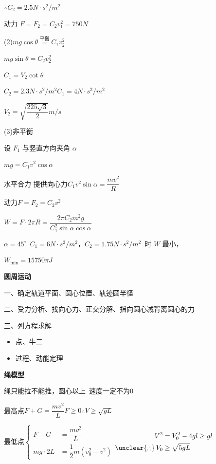 \begin{problem}
\begin{solution}
\par $\therefore C_2=2.5\unit{N\cdot s^2/m^2}$
\par 动力 $F=F_2=C_2v_1^2=750\unit{N}$
\par (2)\quad $mg\cos\theta\overset{\text{平衡}}{=}C_1v_2^2$
\par $mg\sin\theta=C_2v_2^2$
\par $C_1=V_2\cot\theta$ %
\par $C_2=2.3\unit{N\cdot s^2/m^2}$\quad $C_1=4\unit{N\cdot s^2/m^2}$
\par $V_2=\sqrt{\dfrac{225\sqrt{3}}{2}}\unit{m/s}$
\par (3)\quad 非平衡
\par 设 $F_1$ 与竖直方向夹角 $\alpha$
\par $mg=C_1v^2\cos\alpha$
\par 水平合力 提供向心力\quad $C_1v^2\sin\alpha=\dfrac{mv^2}{R}$
\par 动力\quad $F=F_2=C_2v^2$
\par $W=F\cdot 2\pi R=\dfrac{2\pi C_2m^2g}{C_1^2\sin\alpha\cos\alpha}$
\par $\alpha=45^\circ$\ $C_1=6\unit{N\cdot s^2/m^2}$，$C_2=1.75\unit{N\cdot s^2/m^2}$\ 时 $W$ 最小， %
\par $W_{\min}=15750\pi\unit{J}$
\end{solution}
\end{problem}
\textbf{圆周运动}
\par 一、确定轨道平面、圆心位置、轨迹圆半径
\par 二、受力分析、找向心力、正交分解、指向圆心减背离圆心的力
\par 三、列方程求解
\begin{itemize}
\item 点、牛二
\item 过程、动能定理
\end{itemize}
\textbf{绳模型}
\par 绳只能拉不能推，圆心以上\ 速度一定不为0
\par 最高点\quad $F+G=\dfrac{mv^2}{L}$\qquad $F\ge0$\quad $\therefore V\ge\sqrt{gL}$
\par 最低点\quad $\left\{\begin{aligned}F-G&=\dfrac{mv^2}{L}\\ mg\cdot2L&=\dfrac{1}{2}m(v_0^2-v^2)\end{aligned}\right.$\qquad $\begin{aligned}V^2&=V_0^2-4gl\ge gl\\ \unclear{\therefore}\,V_0&\ge\sqrt{5gL}\end{aligned}$
